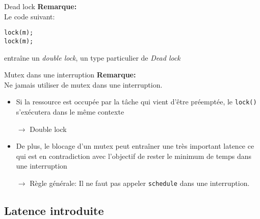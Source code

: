 \begin{frame}[fragile]{Dead lock}
  \textbf{Remarque:} \\
  Le code suivant:
  \begin{lstlisting}
lock(m);
lock(m);
  \end{lstlisting}
  entraîne un  \emph{double lock},  un type particulier  de \emph{Dead
    lock}
\end{frame}

\begin{frame}[fragile]{Mutex dans une interruption}
  \textbf{Remarque:} \\
  Ne jamais utiliser de mutex dans une interruption.
  \begin{itemize}
  \item  Si la ressource  est occupée  par la  tâche qui  vient d'être
    préemptée, le \texttt{lock()} s'exécutera dans le même contexte
  \item[$\rightarrow$] Double lock
  \item  De  plus, le  blocage  d'un  mutex  peut entraîner  une  très
    important latence  ce qui est en contradiction  avec l'objectif de
    rester le minimum de temps dans une interruption
  \item[$\rightarrow$]  Règle  générale:   Il  ne  faut  pas  appeler
    \texttt{schedule} dans une interruption.
  \end{itemize}
\end{frame}

\subsection{Latence introduite}


